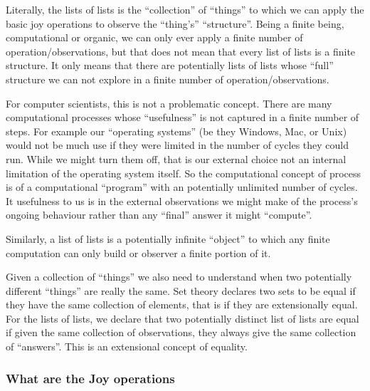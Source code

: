 \documentclass[a4paper,openany]{amsart}
\begin{document}
Literally, the lists of lists is the ``collection'' of ``things'' to which we
can apply the basic joy operations to observe the ``thing's'' ``structure''. Being
a finite being, computational or organic, we can only ever apply a finite number
of operation/observations, but that does not mean that every list of lists is a
finite structure. It only means that there are potentially lists of lists whose
``full'' structure we can not explore in a finite number of
operation/observations.

For computer scientists, this is not a problematic concept. There are many
computational processes whose ``usefulness'' is not captured in a finite number
of steps. For example our ``operating systems'' (be they Windows, Mac, or Unix)
would not be much use if they were limited in the number of cycles they could
run. While we might turn them off, that is our external choice not an internal
limitation of the operating system itself. So the computational concept of
process is of a computational ``program'' with an potentially unlimited number
of cycles. It usefulness to us is in the external observations we might make of
the process's ongoing behaviour rather than any ``final'' answer it might
``compute''.

Similarly, a list of lists is a potentially infinite ``object'' to which any
finite computation can only build or observer a finite portion of it.

Given a collection of ``things'' we also need to understand when two potentially
different ``things'' are really the same. Set theory declares two sets to be
equal if they have the same collection of elements, that is if they are
extensionally equal. For the lists of lists, we declare that two potentially
distinct list of lists are equal if given the same collection of observations,
they always give the same collection of ``answers''. This is an extensional
concept of equality.

\subsubsection{What are the Joy operations}
\end{document}
